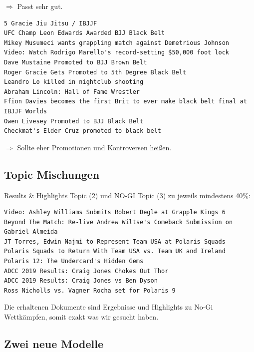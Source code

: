 \noindent$\Rightarrow$ Passt sehr gut.

{\color{MidnightBlue}
\begin{lstlisting}
5 Gracie Jiu Jitsu / IBJJF
UFC Champ Leon Edwards Awarded BJJ Black Belt
Mikey Musumeci wants grappling match against Demetrious Johnson
Video: Watch Rodrigo Marello's record-setting $50,000 foot lock
Dave Mustaine Promoted to BJJ Brown Belt
Roger Gracie Gets Promoted to 5th Degree Black Belt
Leandro Lo killed in nightclub shooting
Abraham Lincoln: Hall of Fame Wrestler
Ffion Davies becomes the first Brit to ever make black belt final at IBJJF Worlds
Owen Livesey Promoted to BJJ Black Belt
Checkmat's Elder Cruz promoted to black belt
\end{lstlisting}}

\noindent$\Rightarrow$ Sollte eher Promotionen und Kontroversen hei{\ss}en.

\subsection{Topic Mischungen}

Results \& Highlights Topic (2) und NO-GI Topic (3) zu jeweils mindestens 40\%: \\

{\color{MidnightBlue}
\begin{lstlisting}
Video: Ashley Williams Submits Robert Degle at Grapple Kings 6                  
Beyond The Match: Re-live Andrew Wiltse's Comeback Submission on Gabriel Almeida
JT Torres, Edwin Najmi to Represent Team USA at Polaris Squads                  
Polaris Squads to Return With Team USA vs. Team UK and Ireland                  
Polaris 12: The Undercard's Hidden Gems                                         
ADCC 2019 Results: Craig Jones Chokes Out Thor                                  
ADCC 2019 Results: Craig Jones vs Ben Dyson                                     
Ross Nicholls vs. Vagner Rocha set for Polaris 9
\end{lstlisting}}

\noindent Die erhaltenen Dokumente sind Ergebnisse und Highlights zu No-Gi Wettkämpfen, somit exakt was wir gesucht haben.

\subsection{Zwei neue Modelle}

